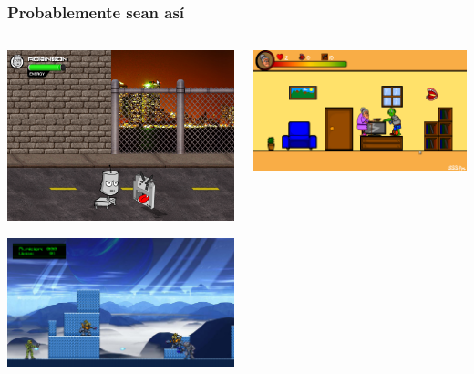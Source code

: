 \documentclass{beamer}
\begin{document}
\begin{frame}
	\frametitle{Probablemente sean así}
	\begin{columns}[c]
	\column{150pt}	
	\begin{center}
	    \includegraphics[scale=0.15]{img/robinson.png}

	    \includegraphics[scale=0.13]{img/spacepenguin.png}
	\end{center}
	
	\column{150pt}
	\begin{center}
	    \includegraphics[scale=0.15]{img/grannysbloodbath.png}
    

\end{center}
\end{columns}
\end{frame}
\end{document}
